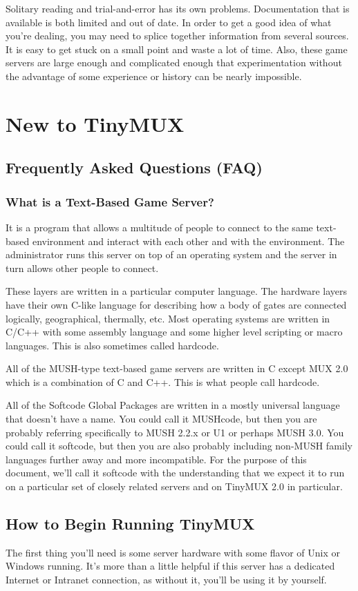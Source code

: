 \documentclass{book}
\begin{document}
Solitary reading and trial-and-error has its own problems. Documentation that
is available is both limited and out of date. In order to get a good idea of
what you're dealing, you may need to splice together information from several
sources. It is easy to get stuck on a small point and waste a lot of time.
Also, these game servers are large enough and complicated enough that
experimentation without the advantage of some experience or history can be
nearly impossible.
\chapter{New to TinyMUX}
\section{Frequently Asked Questions (FAQ)}
\subsection{What is a Text-Based Game Server?}
It is a program that allows a multitude of people to connect to the same
text-based environment and interact with each other and with the environment.
The administrator runs this server on top of an operating system and the server
in turn allows other people to connect. %

These layers are written in a particular computer language. The hardware
layers have their own C-like language for describing how a body of gates are
connected logically, geographical, thermally, etc.  Most operating systems are
written in C/C++ with some assembly language and some higher level scripting
or macro languages. This is also sometimes called hardcode.

All of the MUSH-type text-based game servers are written in C except MUX 2.0
which is a combination of C and C++. This is what people call hardcode.

All of the Softcode Global Packages are written in a mostly universal language
that doesn't have a name. You could call it MUSHcode, but then you are probably
referring specifically to MUSH 2.2.x or U1 or perhaps MUSH 3.0. You could call
it softcode, but then you are also probably including non-MUSH family languages
further away and more incompatible. For the purpose of this document, we'll
call it softcode with the understanding that we expect it to run on a particular
set of closely related servers and on TinyMUX 2.0 in particular.

\section{How to Begin Running TinyMUX}
The first thing you'll need is some server hardware with some flavor of Unix or
Windows running. It's more than a little helpful if this server has a dedicated
Internet or Intranet connection, as without it, you'll be using it by yourself.
\end{document}
